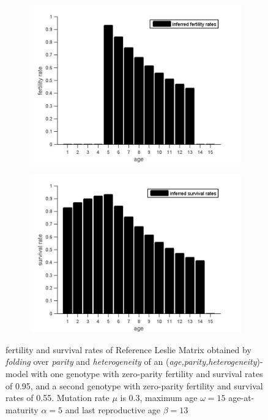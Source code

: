 \documentclass[10pt,a4paper]{article}
\begin{document}
\begin{figure}[hbtp]%
\centering
\begin{subfigure}{.5\textwidth}
\centering
\includegraphics[scale=.22]{inferred_fert_by_age.jpg}
\caption{}%
\label{fig:fertsurvsub1}
\end{subfigure}%
\begin{subfigure}{.5\textwidth}
\centering
\includegraphics[scale=.22]{inferred_surv_by_age.jpg}
\caption{}
\label{fig:fertsurvsub2}
\end{subfigure}%
\caption{fertility and survival rates of Reference Leslie Matrix obtained by \emph{folding} over \emph{parity} and \emph{heterogeneity} of an (\emph{age,parity,heterogeneity})-model with one genotype with zero-parity fertility and survival rates of 0.95, and a second genotype with zero-parity fertility and survival rates of 0.55. Mutation rate $\mu$ is 0.3, maximum age $\omega=15$ age-at-maturity $\alpha=5$ and last reproductive age $\beta=13$  }
\label{fig:fertsurv}
\end{figure}%
\end{document}
